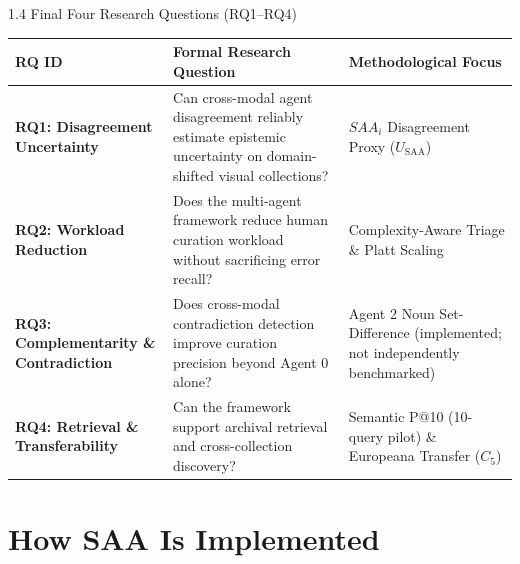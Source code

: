 \documentclass[aspectratio=169,11pt]{beamer}
\begin{document}
\begin{frame}{1.4 Final Four Research Questions (RQ1--RQ4)}
\scriptsize
\centering
\begin{table}[!htbp]
\begin{tabular}{p{3.1cm}p{5.4cm}p{3.3cm}}
\toprule
\textbf{RQ ID} & \textbf{Formal Research Question} & \textbf{Methodological Focus} \\
\midrule
\textbf{RQ1: Disagreement Uncertainty} & Can cross-modal agent disagreement reliably estimate epistemic uncertainty on domain-shifted visual collections? & $SAA_i$ Disagreement Proxy ($U_{\text{SAA}}$) \\
\textbf{RQ2: Workload Reduction} & Does the multi-agent framework reduce human curation workload without sacrificing error recall? & Complexity-Aware Triage \& Platt Scaling \\
\textbf{RQ3: Complementarity \& Contradiction} & Does cross-modal contradiction detection improve curation precision beyond Agent 0 alone? & Agent 2 Noun Set-Difference (implemented; not independently benchmarked) \\
\textbf{RQ4: Retrieval \& Transferability} & Can the framework support archival retrieval and cross-collection discovery? & Semantic P@10 (10-query pilot) \& Europeana Transfer ($C_5$) \\
\bottomrule
\end{tabular}
\end{table}
\end{frame}

\section{How SAA Is Implemented}
\end{document}
